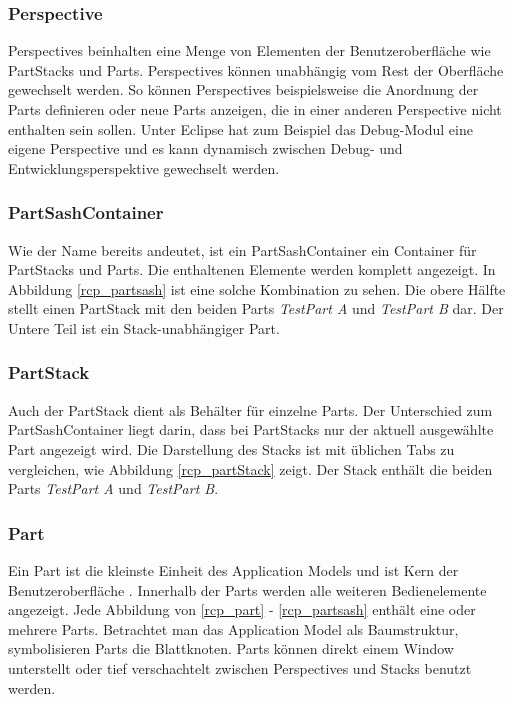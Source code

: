 \subsubsection{Perspective}
Perspectives beinhalten eine Menge von Elementen der Benutzeroberfläche wie PartStacks und Parts. Perspectives können unabhängig vom Rest der Oberfläche gewechselt werden\cite[org.eclipse.e4.ui.model.application.ui.advanced]{eclipse:help}. So können Perspectives beispielsweise die Anordnung der Parts definieren  oder neue Parts anzeigen, die in einer anderen Perspective nicht enthalten sein sollen. Unter Eclipse hat zum Beispiel das Debug-Modul eine eigene Perspective und es kann dynamisch zwischen Debug- und Entwicklungsperspektive gewechselt werden.

\subsubsection{PartSashContainer}
Wie der Name bereits andeutet, ist ein PartSashContainer ein Container für PartStacks und Parts. Die enthaltenen Elemente werden komplett angezeigt. In Abbildung \ref{rcp_partsash} ist eine solche Kombination zu sehen. Die obere Hälfte stellt einen PartStack mit den beiden Parts \textit{TestPart A} und \textit{TestPart B} dar. Der Untere Teil ist ein Stack-unabhängiger Part.

\subsubsection{PartStack}
Auch der PartStack dient als Behälter für einzelne Parts. Der Unterschied zum PartSash\-Container liegt darin, dass bei PartStacks nur der aktuell ausgewählte Part angezeigt wird. Die Darstellung des Stacks ist mit üblichen Tabs zu vergleichen, wie Abbildung \ref{rcp_partStack} zeigt. Der Stack enthält die beiden Parts \textit{TestPart A} und \textit{TestPart B}.

\subsubsection{Part}
Ein Part ist die kleinste Einheit des Application Models und ist Kern der Benutzer\-oberfläche \cite[org.eclipse.e4.ui.model.application.ui.basic]{eclipse:help}. Innerhalb der Parts werden alle weiteren Bedienelemente angezeigt. Jede Abbildung von \ref{rcp_part} - \ref{rcp_partsash} enthält eine oder mehrere Parts. Betrachtet man das Application Model als Baumstruktur, symbolisieren Parts die Blattknoten. Parts können direkt einem Window unterstellt oder tief verschachtelt zwischen Perspectives und Stacks benutzt werden.



